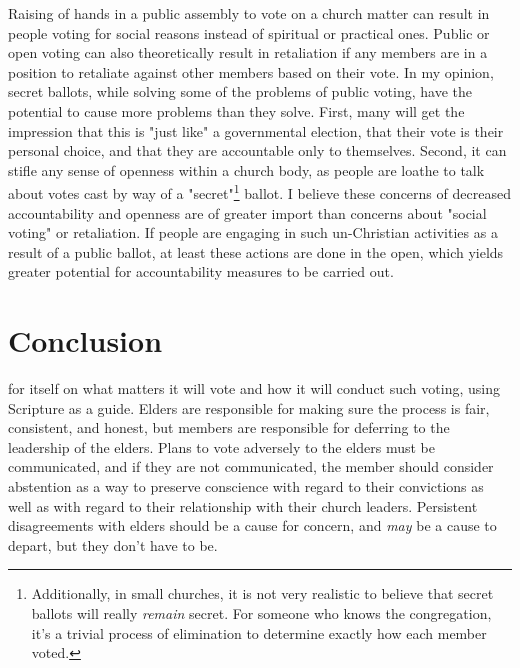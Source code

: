 Raising of hands in a public assembly to vote on a church matter can result in people voting for social reasons instead of spiritual or practical ones.  Public or open voting can also theoretically result in retaliation if any members are in a position to retaliate against other members based on their vote.  In my opinion, secret ballots, while solving some of the problems of public voting, have the potential to cause more problems than they solve.  First, many will get the impression that this is "just like" a governmental election, that their vote is their personal choice, and that they are accountable only to themselves.  Second, it can stifle any sense of openness within a church body, as people are loathe to talk about votes cast by way of a "secret"\footnote{Additionally, in small churches, it is not very realistic to believe that secret ballots will really \textit{remain} secret.  For someone who knows the congregation, it's a trivial process of elimination to determine exactly how each member voted.} ballot.  I believe these concerns of decreased accountability and openness are of greater import than concerns about "social voting" or retaliation.  If people are engaging in such un-Christian activities as a result of a public ballot, at least these actions are done in the open, which yields greater potential for accountability measures to be carried out.

\ifdefined\embedversion\newpage\fi
\section{Conclusion}
 for itself on what matters it will vote and how it will conduct such voting, using Scripture as a guide.  Elders are responsible for making sure the process is fair, consistent, and honest, but members are responsible for deferring to the leadership of the elders.  Plans to vote adversely to the elders must be communicated, and if they are not communicated, the member should consider abstention as a way to preserve conscience with regard to their convictions as well as with regard to their relationship with their church leaders.  Persistent disagreements with elders should be a cause for concern, and \textit{may} be a cause to depart, but they don't have to be.  

